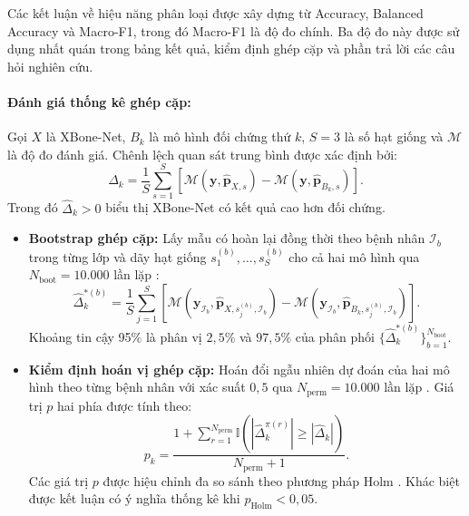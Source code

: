 Các kết luận về hiệu năng phân loại được xây dựng từ Accuracy, Balanced Accuracy và Macro-F1, trong đó Macro-F1 là độ đo chính. Ba độ đo này được sử dụng nhất quán trong bảng kết quả, kiểm định ghép cặp và phần trả lời các câu hỏi nghiên cứu.

\paragraph{Đánh giá thống kê ghép cặp:}
Gọi $X$ là XBone-Net, $B_k$ là mô hình đối chứng thứ $k$, $S=3$ là số hạt giống và $\mathcal{M}$ là độ đo đánh giá. Chênh lệch quan sát trung bình được xác định bởi:
\begin{equation}
\widehat{\Delta}_{k}
=\frac{1}{S}\sum_{s=1}^{S}
\left[
\mathcal{M}\!\left(\mathbf{y},\widehat{\mathbf{p}}_{X,s}\right)
-\mathcal{M}\!\left(\mathbf{y},\widehat{\mathbf{p}}_{B_k,s}\right)
\right].
\label{eq:ch4_paired_observed_delta}
\end{equation}
Trong đó $\widehat{\Delta}_k > 0$ biểu thị XBone-Net có kết quả cao hơn đối chứng.
\begin{itemize}
    \item \textbf{Bootstrap ghép cặp:} Lấy mẫu có hoàn lại đồng thời theo bệnh nhân $\mathcal{I}_b$ trong từng lớp và dãy hạt giống $s_1^{(b)}, \ldots, s_S^{(b)}$ cho cả hai mô hình qua $N_{\mathrm{boot}}=10.000$ lần lặp \cite{EfronTibshirani1993Bootstrap}:
    \begin{equation}
    \widehat{\Delta}_{k}^{*(b)}
    =\frac{1}{S}\sum_{j=1}^{S}
    \left[
    \mathcal{M}\!\left(\mathbf{y}_{\mathcal{I}_{b}},
    \widehat{\mathbf{p}}_{X,s_{j}^{(b)},\mathcal{I}_{b}}\right)
    -\mathcal{M}\!\left(\mathbf{y}_{\mathcal{I}_{b}},
    \widehat{\mathbf{p}}_{B_k,s_{j}^{(b)},\mathcal{I}_{b}}\right)
    \right].
    \label{eq:ch4_paired_bootstrap_delta}
    \end{equation}
    Khoảng tin cậy 95\% là phân vị $2{,}5\%$ và $97{,}5\%$ của phân phối $\{\widehat{\Delta}_{k}^{*(b)}\}_{b=1}^{N_{\mathrm{boot}}}$.
    \item \textbf{Kiểm định hoán vị ghép cặp:} Hoán đổi ngẫu nhiên dự đoán của hai mô hình theo từng bệnh nhân với xác suất $0{,}5$ qua $N_{\mathrm{perm}}=10.000$ lần lặp \cite{Good2005PermutationBootstrap}. Giá trị $p$ hai phía được tính theo:
    \begin{equation}
    p_{k}=\frac{
    1+\displaystyle\sum_{r=1}^{N_{\mathrm{perm}}}
    \mathbb{I}\!\left(
    \left|\widehat{\Delta}_{k}^{\pi(r)}\right|
    \geq \left|\widehat{\Delta}_{k}\right|
    \right)}{N_{\mathrm{perm}}+1}.
    \label{eq:ch4_paired_permutation_pvalue}
    \end{equation}
    Các giá trị $p$ được hiệu chỉnh đa so sánh theo phương pháp Holm \cite{Holm1979Sequential}. Khác biệt được kết luận có ý nghĩa thống kê khi $p_{\mathrm{Holm}} < 0{,}05$.
\end{itemize}

